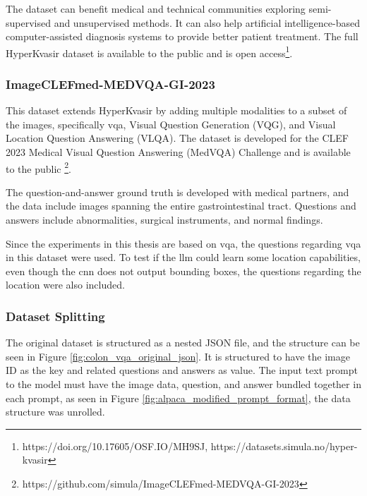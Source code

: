         The dataset can benefit medical and technical communities exploring semi-supervised and unsupervised methods. It can also help artificial intelligence-based computer-assisted diagnosis systems to provide better patient treatment.
        The full HyperKvasir dataset is available to the public and is open access\footnote{https://doi.org/10.17605/OSF.IO/MH9SJ, https://datasets.simula.no/hyper-kvasir}.


      
        \subsubsection{ImageCLEFmed-MEDVQA-GI-2023}

        This dataset extends HyperKvasir by adding multiple modalities to a subset of the images, specifically \gls{vqa}, Visual Question Generation (VQG), and Visual Location Question Answering (VLQA).
        The dataset is developed for the CLEF 2023 Medical Visual Question Answering (MedVQA) Challenge and is available to the public \footnote{https://github.com/simula/ImageCLEFmed-MEDVQA-GI-2023}.
        
        The  question-and-answer ground truth is developed with medical partners, and the data include images spanning the entire gastrointestinal tract. Questions and answers include abnormalities, surgical instruments, and normal findings. 
        
        Since the experiments in this thesis are based on \gls{vqa}, the questions regarding \gls{vqa} in this dataset were used. To test if the \gls{llm} could learn some location capabilities, even though the \gls{cnn} does not output bounding boxes, the questions regarding the location were also included. 
        

        \subsubsection{Dataset Splitting}
        
        The original dataset is structured as a nested JSON file, and the structure can be seen in Figure \ref{fig:colon_vqa_original_json}.
        It is structured to have the image ID as the key and related questions and answers as value. The input text prompt to the model must have the image data, question, and answer bundled together in each prompt, as seen in Figure \ref{fig:alpaca_modified_prompt_format}, the data structure was unrolled. 


